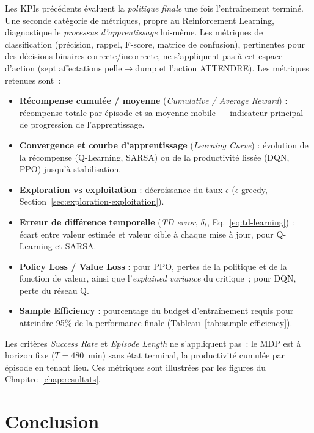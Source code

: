 \documentclass[11pt,a4paper]{report}
\begin{document}
Les KPIs précédents évaluent la \emph{politique finale} une fois l'entraînement terminé. Une seconde catégorie de métriques, propre au Reinforcement Learning, diagnostique le \emph{processus d'apprentissage} lui-même. Les métriques de classification (précision, rappel, F-score, matrice de confusion), pertinentes pour des décisions binaires correcte/incorrecte, ne s'appliquent pas à cet espace d'action (sept affectations pelle$\to$dump et l'action ATTENDRE). Les métriques retenues sont~:

\begin{itemize}
    \item \textbf{Récompense cumulée / moyenne} (\textit{Cumulative / Average Reward}) : récompense totale par épisode et sa moyenne mobile --- indicateur principal de progression de l'apprentissage.

    \item \textbf{Convergence et courbe d'apprentissage} (\textit{Learning Curve}) : évolution de la récompense (Q-Learning, SARSA) ou de la productivité lissée (DQN, PPO) jusqu'à stabilisation.

    \item \textbf{Exploration vs exploitation} : décroissance du taux $\epsilon$ ($\epsilon$-greedy, Section~\ref{sec:exploration-exploitation}).

    \item \textbf{Erreur de différence temporelle} (\textit{TD error}, $\delta_t$, Eq.~\ref{eq:td-learning}) : écart entre valeur estimée et valeur cible à chaque mise à jour, pour Q-Learning et SARSA.

    \item \textbf{Policy Loss / Value Loss} : pour PPO, pertes de la politique et de la fonction de valeur, ainsi que l'\textit{explained variance} du critique~; pour DQN, perte du réseau Q.

    \item \textbf{Sample Efficiency} : pourcentage du budget d'entraînement requis pour atteindre 95\% de la performance finale (Tableau~\ref{tab:sample-efficiency}).
\end{itemize}

Les critères \textit{Success Rate} et \textit{Episode Length} ne s'appliquent pas~: le MDP est à horizon fixe ($T = 480$~min) sans état terminal, la productivité cumulée par épisode en tenant lieu. Ces métriques sont illustrées par les figures du Chapitre~\ref{chap:resultats}.

\section{Conclusion}
\label{sec:conclusion-implementation}
\end{document}
